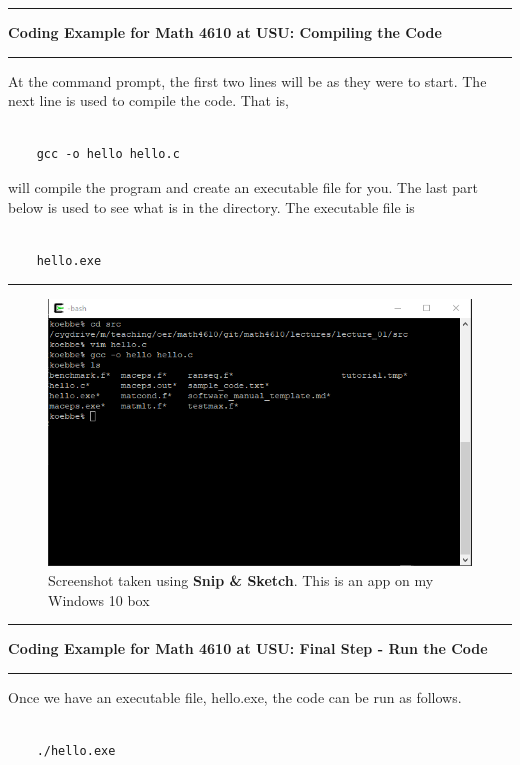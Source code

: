 \documentclass[10pt,fleqn]{article}
\begin{document}
\eject
\vskip0.1in\hrule\vskip0.1in
\noindent
{\bf Coding Example for Math 4610 at USU: Compiling the Code} 
\vskip0.1in\hrule\vskip0.1in
\noindent
At the command prompt, the first two lines will be as they were to start. The
next line is used to compile the code. That is,
\begin{verbatim}

    gcc -o hello hello.c

\end{verbatim}
will compile the program and create an executable file for you. The last part
below is used to see what is in the directory. The executable file is
\begin{verbatim}

    hello.exe

\end{verbatim}
\vskip0.1in\hrule\vskip0.1in
\vfill
\begin{figure}[h]
\centering
\includegraphics{../images/coding_05.png}
\caption{{Screenshot} taken using {\bf Snip \& Sketch}. This is an app on
         my Windows 10 box}
\end{figure}
\eject
\vskip0.1in\hrule\vskip0.1in
\noindent
{\bf Coding Example for Math 4610 at USU: Final Step - Run the Code} 
\vskip0.1in\hrule\vskip0.1in
\noindent
Once we have an executable file, hello.exe, the code can be run as follows.
\begin{verbatim}

    ./hello.exe

\end{verbatim}
\end{document}

